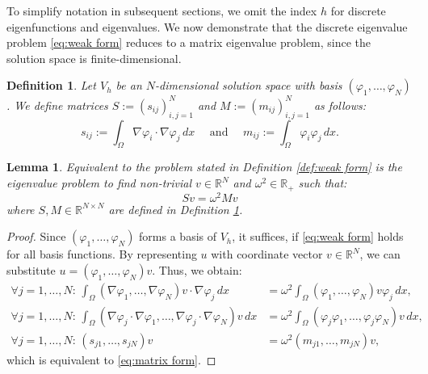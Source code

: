 \documentclass[a4paper,11pt,bibliography=totoc,listof=totoc,headinclude=true,cleardoublepage=empty,oneside]{scrbook}
\newtheorem{definition}[theorem]{Definition}
\newtheorem{lemma}[theorem]{Lemma}
\newcommand{\R}{\mathbb{R}}
\begin{document}
To simplify notation in subsequent sections, we omit the index $h$ for discrete eigenfunctions and eigenvalues. We now demonstrate that the discrete eigenvalue problem \eqref{eq:weak form} reduces to a matrix eigenvalue problem, since the solution space is finite-dimensional.

\begin{definition}\label{def:SM matrices}
Let $V_h$ be an $N$-dimensional solution space with basis $(\varphi_1, \dots, \varphi_N)$. We define matrices $S:=(s_{ij})_{i, j=1}^N $ and $M:=(m_{ij})_{i, j=1}^N $ as follows:
\begin{equation*}
s_{ij} := \int_\Omega \nabla \varphi_i \cdot \nabla \varphi_j \, dx \quad \text{ and } \quad m_{ij} := \int_\Omega \varphi_i \varphi_j \, dx.
\end{equation*}
\end{definition}

\begin{lemma}
Equivalent to the problem stated in Definition \ref{def:weak form} is the eigenvalue problem to find non-trivial $v \in \R^N$ and $\omega^2 \in \R_+$ such that:
\begin{equation}\label{eq:matrix form}
Sv = \omega^2 Mv
\end{equation}
where $S, M \in \R^{N \times N}$ are defined in Definition \ref{def:SM matrices}.
\end{lemma}

\begin{proof}
Since $(\varphi_1, \dots, \varphi_N)$ forms a basis of $V_h$, it suffices, if \eqref{eq:weak form} holds for all basis functions. By representing $u$ with coordinate vector $v\in \R^N$, we can substitute $u = (\varphi_1, \dots, \varphi_N) v$. Thus, we obtain:
\begin{align*}
        \forall j=1, \dots, N : \, \int_\Omega (\nabla\varphi_1, \dots, \nabla\varphi_N)v\cdot \nabla \varphi_j \, dx &= \omega^2 \int_\Omega (\varphi_1, \dots, \varphi_N)v \varphi_j \, dx, \\
        \forall j=1, \dots, N : \, \int_\Omega (\nabla \varphi_j \cdot \nabla \varphi_1, \dots, \nabla \varphi_j \cdot \nabla \varphi_N) v \, dx &= \omega^2 \int_\Omega (\varphi_j\varphi_1, \dots, \varphi_j\varphi_N)v \,dx, \\ 
        \forall j = 1, \dots, N: \, (s_{j1},\dots,s_{jN})v &= \omega^2 (m_{j1},\dots, m_{jN})v,
\end{align*}
which is equivalent to \eqref{eq:matrix form}.
\end{proof}
\end{document}
